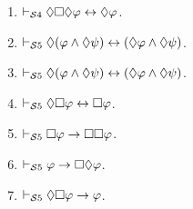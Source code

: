\documentclass[a4paper, 11pt]{article}                  %
\begin{document}
\begin{enumerate}
	\item $\vdash_{\mathcal{S}4} \Diamond\Box\Diamond \varphi\leftrightarrow\Diamond \varphi$.

	\item $\vdash_{\mathcal{S}5} \Diamond(\varphi\wedge\Diamond \psi)\leftrightarrow(\Diamond \varphi\wedge\Diamond \psi)$.

	\item $\vdash_{\mathcal{S}5} \Diamond(\varphi\wedge\Diamond \psi)\leftrightarrow(\Diamond \varphi\wedge\Diamond \psi)$.

	\item $\vdash_{\mathcal{S}5} \Diamond\Box \varphi\leftrightarrow\Box \varphi$.

	\item $\vdash_{\mathcal{S}5} \Box \varphi \rightarrow \Box\Box \varphi$.

	\item $\vdash_{\mathcal{S}5} \varphi \rightarrow \Box\Diamond \varphi$.

	\item $\vdash_{\mathcal{S}5} \Diamond\Box \varphi \rightarrow \varphi$.


\end{enumerate}



\vfill
\begin{small} %
	\singlespacing %
	\setlength{\bibsep}{0.5pt} %
	\thispagestyle{empty} %
\end{small} %
\end{document}
